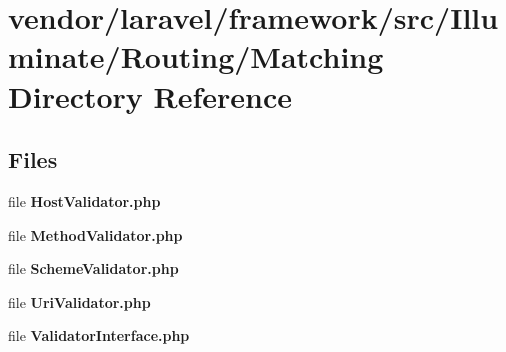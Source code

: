\section{vendor/laravel/framework/src/\+Illuminate/\+Routing/\+Matching Directory Reference}
\label{dir_20025d01888c6d4fbeb6faeb7adafe80}
\subsection*{Files}
\begin{DoxyCompactItemize}
\item 
file {\bf Host\+Validator.\+php}
\item 
file {\bf Method\+Validator.\+php}
\item 
file {\bf Scheme\+Validator.\+php}
\item 
file {\bf Uri\+Validator.\+php}
\item 
file {\bf Validator\+Interface.\+php}
\end{DoxyCompactItemize}
